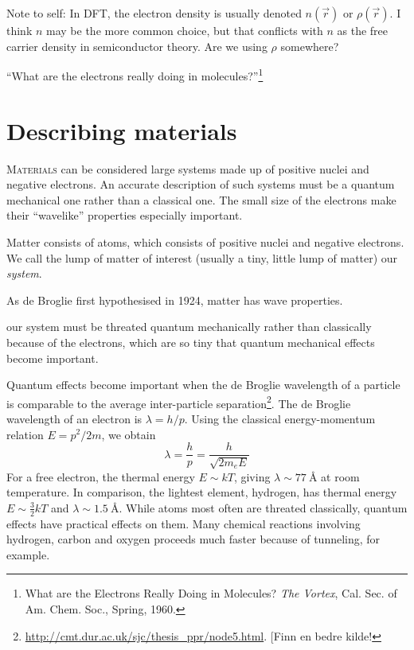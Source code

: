 \documentclass[11pt,bibliography=totoc,index=totoc]{scrbook}   %
\begin{document}
Note to self: In DFT, the electron density is usually denoted $n(\vec{r})$ or
$\rho(\vec{r})$. I think $n$ may be the more common choice, but that conflicts
with $n$ as the free carrier density in semiconductor theory. Are we using
$\rho$ somewhere?

``What are the electrons really doing in molecules?''\footnote{What are the
Electrons Really Doing in Molecules? \textit{The Vortex}, Cal. Sec. of
Am. Chem. Soc., Spring, 1960.}

\section{Describing materials}

\lettrine[lines=3,slope=0pt,nindent=0pt]{M}{aterials}
can be considered large systems made up of positive nuclei and 
negative electrons. An accurate description of such systems must be a 
quantum mechanical one rather than a classical one. The small size of the
electrons make their ``wavelike'' properties especially important.

Matter consists of atoms, which consists of positive nuclei and negative 
electrons. We call the lump of matter of interest (usually a tiny, little lump
of matter) our \emph{system}. 

As de Broglie first hypothesised in 1924\cite{deBroglie:1924}, matter has wave
properties. 

our system must 
be threated quantum mechanically rather than classically because of the electrons, which are so tiny that quantum
mechanical effects become important. 

Quantum effects become important when the
de Broglie wavelength of a particle is comparable to the average inter-particle
separation\footnote{\url{http://cmt.dur.ac.uk/sjc/thesis_ppr/node5.html}. [Finn
en bedre kilde!}. The de Broglie wavelength of an electron is $\lambda=h/p$.
Using the classical energy-momentum relation $E=p^2/2m$, we obtain
\begin{equation}
  \lambda = \frac{h}{p} = \frac{h}{\sqrt{2m_eE}} 
  \label{eq:deBroglieWavelength}
\end{equation}
For a free electron, the thermal energy $E\sim kT$, 
giving $\lambda\sim\SI{77}{\angstrom}$ at
room temperature. In comparison, the lightest element, hydrogen, has thermal
energy $E\sim\frac32 kT$ and 
$\lambda\sim\SI{1.5}{\angstrom}$. While atoms most often are threated
classically, quantum effects have practical effects on them. Many
chemical reactions involving hydrogen, carbon and oxygen proceeds much faster
because of tunneling, for example.
\end{document}
